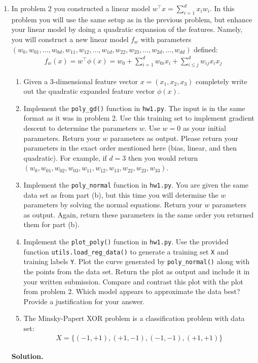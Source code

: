 \documentclass{article}
\theoremstyle{definition}
\theoremstyle{remark}
\newenvironment{Q}
        {%
          \clearpage
          \item
        }
        {%
          \phantom{s} %
          \bigskip
          \textbf{Solution.}
        }
\begin{document}
\begin{enumerate}
\begin{Q}
          In problem 2 you constructed a linear model $w^\top x = \sum_{i=1}^d x_i w_i$.  In this problem you will use the same setup as in the previous problem, but enhance your linear model by doing a quadratic expansion of the features.  Namely, you will construct a new linear model $f_{w}$ with parameters $(w_{0}, w_{01},\dots,w_{0d},w_{11}, w_{12},\dots,w_{1d},w_{22}, w_{23},\dots,w_{2d},\dots, w_{dd})$ defined:
          	\begin{align*}
          	f_{w}(x) = w^\top \phi(x) = w_0 + \sum_{i=1}^d w_{0i} x_i + \sum_{i\leq j}^dw_{ij} x_ix_j
          	\end{align*}
          \begin{enumerate}
          \item Given a $3$-dimensional feature vector $x = (x_1,x_2,x_3)$ completely write out the quadratic expanded feature vector $\phi(x)$.
          \item Implement the \texttt{poly\_gd()} function in \texttt{hw1.py}.  The input is in the same format as it was in problem 2.  Use this training set to implement gradient descent to determine the parameters $w$.  Use $w = 0$ as your initial parameters.  Return your $w$ parameters as output.  Please return your parameters in the exact order mentioned here (bias, linear, and then quadratic).  For example, if $d = 3$ then you would return $(w_0, w_{01},w_{02},w_{03},w_{11},w_{12},w_{13},w_{22},w_{23},w_{33})
$.          \item Implement the \texttt{poly\_normal} function in \texttt{hw1.py}.  You are given the same data set as from part (b), but this time you will determine the $w$ parameters by solving the normal equations.  Return your $w$ parameters as output.  Again, return these parameters in the same order you returned them for part (b).
          \item Implement the \texttt{plot\_poly()} function in \texttt{hw1.py}.  Use the provided function \texttt{utils.load\_reg\_data()} to generate a training set \texttt{X} and training labels \texttt{Y}. Plot the curve generated by \texttt{poly\_normal()} along with the points from the data set.  Return the plot as output and include it in your written submission.  Compare and contrast this plot with the plot from problem 2.  Which model appears to approximate the data best? Provide a justification for your answer.
          \item The Minsky-Papert XOR problem is a classification problem with data set: \begin{align*}
          X = \{(-1,+1), (+1,-1), (-1,-1),(+1,+1)\}

\end{align*}
\end{enumerate}
\end{Q}
\end{enumerate}
\end{document}
